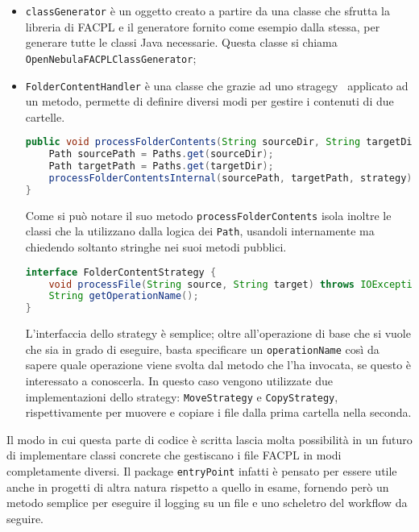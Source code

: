 \begin{itemize}
    \item \texttt{classGenerator} è un oggetto creato a partire da una classe che sfrutta la libreria di FACPL e il generatore fornito come esempio dalla stessa, per generare tutte le classi Java necessarie. Questa classe si chiama \texttt{OpenNebulaFACPLClassGenerator};
    \item \texttt{FolderContentHandler} è una classe che grazie ad uno stragegy~\cite{GOF} applicato ad un metodo, permette di definire diversi modi per gestire i contenuti di due cartelle.
    \begin{lstlisting}[language=Java, xleftmargin=1em, caption=Metodo processFolderContent, label=code:processFolderContent, basicstyle=\fontsize{9.5}{10}\ttfamily]
public void processFolderContents(String sourceDir, String targetDir, FolderContentStrategy strategy) throws IOException {
    Path sourcePath = Paths.get(sourceDir);
    Path targetPath = Paths.get(targetDir);
    processFolderContentsInternal(sourcePath, targetPath, strategy);
}
            \end{lstlisting}
    Come si può notare il suo metodo \texttt{processFolderContents} isola inoltre le classi che la utilizzano dalla logica dei \texttt{Path}, usandoli internamente ma chiedendo soltanto stringhe nei suoi metodi pubblici.
    \begin{lstlisting}[language=Java, xleftmargin=1em, caption=Interfaccia FolderContentStrategy, label=code:FolderContentStrategy, basicstyle=\fontsize{9.5}{10}\ttfamily]
interface FolderContentStrategy {
    void processFile(String source, String target) throws IOException;
    String getOperationName();
}
    \end{lstlisting}
    L'interfaccia dello strategy è semplice; oltre all'operazione di base che si vuole che sia in grado di eseguire, basta specificare un \texttt{operationName} così da sapere quale operazione viene svolta dal metodo che l'ha invocata, se questo è interessato a conoscerla.
    In questo caso vengono utilizzate due implementazioni dello strategy: \texttt{MoveStrategy} e \texttt{CopyStrategy}, rispettivamente per muovere e copiare i file dalla prima cartella nella seconda.
\end{itemize}
Il modo in cui questa parte di codice è scritta lascia molta possibilità in un futuro di implementare classi concrete che gestiscano i file FACPL in modi completamente diversi. Il package \texttt{entryPoint} infatti è pensato per essere utile anche in progetti di altra natura rispetto a quello in esame, fornendo però un metodo semplice per eseguire il logging su un file e uno scheletro del workflow da seguire.

